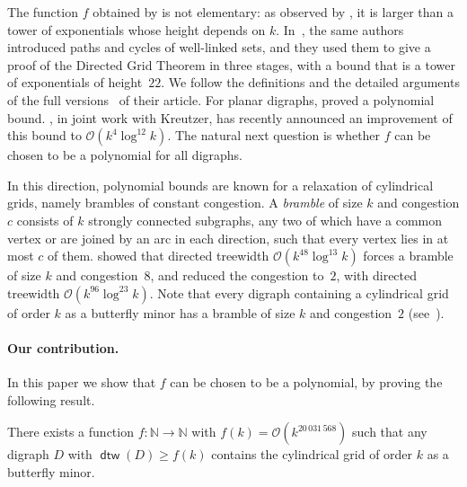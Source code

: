 \documentclass[fontsize=12pt,leading=14pt]{fullpaper}
\DeclareMathOperator{\dtw}{\mathsf{dtw}}
\newcommand{\Ocal}{\mathcal{O}}
\newcommand{\NN}{\mathbb{N}}
\begin{document}
The function $f$ obtained by \textcite{KawarabayashiK15} is not elementary: as observed by \textcite{HKMM26b}, it is larger than a tower of exponentials whose height depends on $k$.
In~\cite{HKMM24}, the same authors introduced paths and cycles of well-linked sets, and they used them to give a proof of the Directed Grid Theorem in three stages, with a bound that is a tower of exponentials of height~$22$.
We follow the definitions and the detailed arguments of the full versions~\cite{HKMM26a,HKMM26b} of their article.
For planar digraphs, \textcite{HKK19} proved a polynomial bound.
\textcite{Schmidt26}, in joint work with Kreutzer, has recently announced an improvement of this bound to $\mathcal{O}(k^4\log^{12}k)$.
The natural next question is whether $f$ can be chosen to be a polynomial for all digraphs.

In this direction, polynomial bounds are known for a relaxation of cylindrical grids, namely brambles of constant congestion.
A \emph{bramble} of size $k$ and congestion $c$ consists of $k$ strongly connected subgraphs, any two of which have a common vertex or are joined by an arc in each direction, such that every vertex lies in at most $c$ of them.
\textcite{MPRS22} showed that directed treewidth $\mathcal{O}(k^{48}\log^{13}k)$ forces a bramble of size $k$ and congestion~$8$, and \textcite{CLNS26} reduced the congestion to~$2$, with directed treewidth $\mathcal{O}(k^{96}\log^{23}k)$.
Note that every digraph containing a cylindrical grid of order $k$ as a butterfly minor has a bramble of size $k$ and congestion~$2$ (see~\cite[Section~1]{CLNS26}).

\paragraph{Our contribution.}
In this paper we show that $f$ can be chosen to be a polynomial, by proving the following result.

\begin{theorem}\label{thm:grid-main}
  There exists a function $f \colon \NN \to \NN$ with $f(k) = \Ocal(k^{20\,031\,568})$ such that any digraph $D$ with $\dtw(D) \ge f(k)$ contains the cylindrical grid of order $k$ as a butterfly minor.
\end{theorem}
\end{document}

